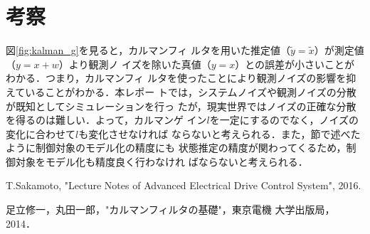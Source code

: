 \documentclass[a4paper,12pt]{jarticle}
\begin{document}
\section{考察}
図\ref{fig:kalman_g}を見ると，カルマンフィ
ルタを用いた推定値（$\tilde{y}=\tilde{x}$）が測定値（$y=x+w$）より観測ノ
イズを除いた真値（$y=x$）との誤差が小さいことがわかる．つまり，カルマンフィ
ルタを使ったことにより観測ノイズの影響を抑えていることがわかる．本レポー
トでは，システムノイズや観測ノイズの分散が既知としてシミュレーションを行っ
たが，現実世界ではノイズの正確な分散を得るのは難しい．よって，カルマンゲ
イン$l$を一定にするのでなく，ノイズの変化に合わせて$l$も変化させなければ
ならないと考えられる．また，節で述べたように制御対象のモデル化の精度にも
状態推定の精度が関わってくるため，制御対象をモデル化も精度良く行わなけれ
ばならないと考えられる．
%
\begin{thebibliography}{99}

  T.Sakamoto,
		 "Lecture Notes of Advanced Electrical Drive Control System", 2016.

  足立修一，丸田一郎，"カルマンフィルタの基礎"，東京電機
		 大学出版局，2014．

\end{thebibliography}
\end{document}
